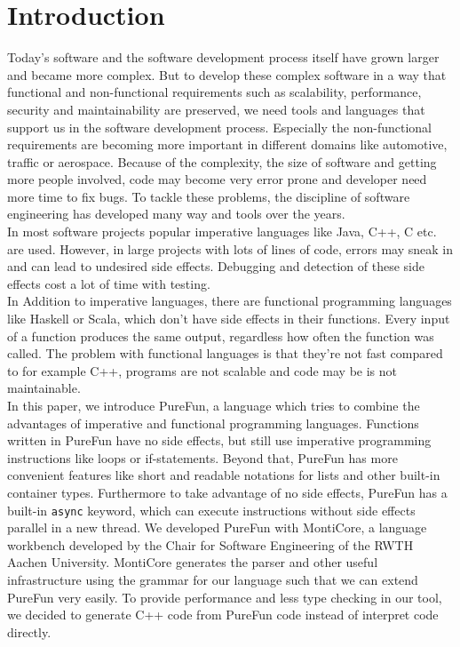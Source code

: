 \section{Introduction}


Today's software and the software development process itself have grown larger and became more complex. But to develop these complex software in a way that functional and non-functional requirements such as scalability, performance, security and maintainability are preserved, we need tools and languages that support us in the software development process.  Especially the non-functional requirements are becoming more important in different domains like automotive, traffic or aerospace. Because of the complexity, the size of software and getting more people involved, code may become very error prone and developer need more time to fix bugs. To tackle these problems, the discipline of software engineering has developed many way and tools over the years.\\
In most software projects popular imperative languages like Java, C++, C etc. are used. However, in large projects with lots of lines of code, errors may sneak in and can lead to undesired side effects. Debugging and detection of these side effects cost a lot of time with testing.\\
In Addition to imperative languages, there are functional programming languages like Haskell or Scala, which don't have side effects in their functions. Every input of a function produces the same output, regardless how often the function was called. The problem with functional languages is that they're not fast compared to for example C++, programs are not scalable and code may be is not maintainable.\\
In this paper, we introduce PureFun, a language which tries to combine the advantages of imperative and functional programming languages. Functions written in PureFun have no side effects, but still use imperative programming instructions like loops or if-statements. Beyond that, PureFun has more convenient features like short and readable notations for lists and other built-in container types. Furthermore to take advantage of no side effects, PureFun has a built-in \lstinline{async}{} keyword, which can execute instructions without side effects parallel in a new thread. We developed PureFun with MontiCore, a language workbench developed by the Chair for Software Engineering of the RWTH Aachen University. MontiCore generates the parser and other useful infrastructure using the grammar for our language such that we can extend PureFun very easily. To provide performance and less type checking in our tool, we decided to generate C++ code from PureFun code instead of interpret code directly.\\
